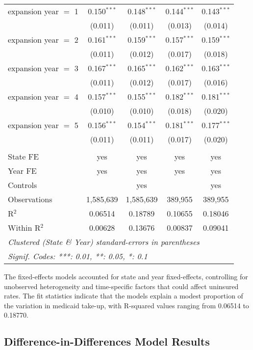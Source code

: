 \documentclass[
]{article}
\let\origtable\table
\let\endorigtable\endtable
\renewenvironment{table}[1][ht]{
      \expandafter\origtable\expandafter[H]
    }{
      \endorigtable
    }
\begin{document}
\begin{table}[htbp]
\begin{tabular}{lcccc}
      expansion year $=$ 1  & 0.150$^{***}$ & 0.148$^{***}$ & 0.144$^{***}$  & 0.143$^{***}$\\   
                            & (0.011)       & (0.011)       & (0.013)        & (0.014)\\   
      expansion year $=$ 2  & 0.161$^{***}$ & 0.159$^{***}$ & 0.157$^{***}$  & 0.159$^{***}$\\   
                            & (0.011)       & (0.012)       & (0.017)        & (0.018)\\   
      expansion year $=$ 3  & 0.167$^{***}$ & 0.165$^{***}$ & 0.162$^{***}$  & 0.163$^{***}$\\   
                            & (0.011)       & (0.012)       & (0.017)        & (0.016)\\   
      expansion year $=$ 4  & 0.157$^{***}$ & 0.155$^{***}$ & 0.182$^{***}$  & 0.181$^{***}$\\   
                            & (0.010)       & (0.010)       & (0.018)        & (0.020)\\   
      expansion year $=$ 5  & 0.156$^{***}$ & 0.154$^{***}$ & 0.181$^{***}$  & 0.177$^{***}$\\   
                            & (0.011)       & (0.011)       & (0.017)        & (0.020)\\   
       \\
      State FE              & yes           & yes           & yes            & yes\\  
      Year FE               & yes           & yes           & yes            & yes\\  
      Controls              &               & yes           &                & yes\\  
      Observations          & 1,585,639     & 1,585,639     & 389,955        & 389,955\\  
      R$^2$                 & 0.06514       & 0.18789       & 0.10655        & 0.18046\\  
      Within R$^2$          & 0.00628       & 0.13676       & 0.00837        & 0.09041\\  
      \midrule \midrule
      \multicolumn{5}{l}{\emph{Clustered (State \& Year) standard-errors in parentheses}}\\
      \multicolumn{5}{l}{\emph{Signif. Codes: ***: 0.01, **: 0.05, *: 0.1}}\\
   \end{tabular}
\end{table}

The fixed-effects models accounted for state and year fixed-effects,
controlling for unobserved heterogeneity and time-specific factors that
could affect uninsured rates. The fit statistics indicate that the
models explain a modest proportion of the variation in medicaid take-up,
with R-squared values ranging from 0.06514 to 0.18770.

\hypertarget{difference-in-differences-model-results}{%
\subsection{Difference-in-Differences Model
Results}\label{difference-in-differences-model-results}}
\end{document}
